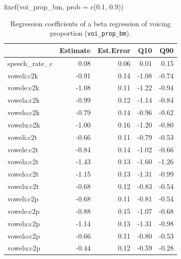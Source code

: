 \documentclass[
  authoryear,
  preprint,
  3p]{elsarticle}
\newenvironment{Shaded}{\begin{snugshade}}{\end{snugshade}}
\newcommand{\AttributeTok}[1]{\textcolor[rgb]{0.40,0.45,0.13}{#1}}
\newcommand{\FloatTok}[1]{\textcolor[rgb]{0.68,0.00,0.00}{#1}}
\newcommand{\FunctionTok}[1]{\textcolor[rgb]{0.28,0.35,0.67}{#1}}
\newcommand{\NormalTok}[1]{\textcolor[rgb]{0.00,0.23,0.31}{#1}}
\begin{document}
\begin{Shaded}
\begin{Highlighting}[]
\FunctionTok{fixef}\NormalTok{(voi\_prop\_bm, }\AttributeTok{prob =} \FunctionTok{c}\NormalTok{(}\FloatTok{0.1}\NormalTok{, }\FloatTok{0.9}\NormalTok{))}
\end{Highlighting}
\end{Shaded}

\begin{longtable}[]{@{}lrrrr@{}}

\caption{\label{tbl-voi-prop-fixef}Regression coefficients of a beta
regression of voicing proportion (\texttt{voi\_prop\_bm}).}

\tabularnewline

\toprule\noalign{}
& Estimate & Est.Error & Q10 & Q90 \\
\midrule\noalign{}
\endhead
\bottomrule\noalign{}
\endlastfoot
speech\_rate\_c & 0.08 & 0.06 & 0.01 & 0.15 \\
voweli:c2k & -0.91 & 0.14 & -1.08 & -0.74 \\
vowele:c2k & -1.08 & 0.11 & -1.22 & -0.94 \\
vowela:c2k & -0.99 & 0.12 & -1.14 & -0.84 \\
vowelo:c2k & -0.79 & 0.14 & -0.96 & -0.62 \\
vowelu:c2k & -1.00 & 0.16 & -1.20 & -0.80 \\
voweli:c2t & -0.66 & 0.11 & -0.79 & -0.53 \\
vowele:c2t & -0.84 & 0.14 & -1.02 & -0.66 \\
vowela:c2t & -1.43 & 0.13 & -1.60 & -1.26 \\
vowelo:c2t & -1.15 & 0.13 & -1.31 & -0.99 \\
vowelu:c2t & -0.68 & 0.12 & -0.83 & -0.54 \\
voweli:c2p & -0.68 & 0.11 & -0.81 & -0.54 \\
vowele:c2p & -0.88 & 0.15 & -1.07 & -0.68 \\
vowela:c2p & -1.14 & 0.13 & -1.31 & -0.98 \\
vowelo:c2p & -0.66 & 0.11 & -0.80 & -0.53 \\
vowelu:c2p & -0.44 & 0.12 & -0.59 & -0.28 \\

\end{longtable}
\end{document}
